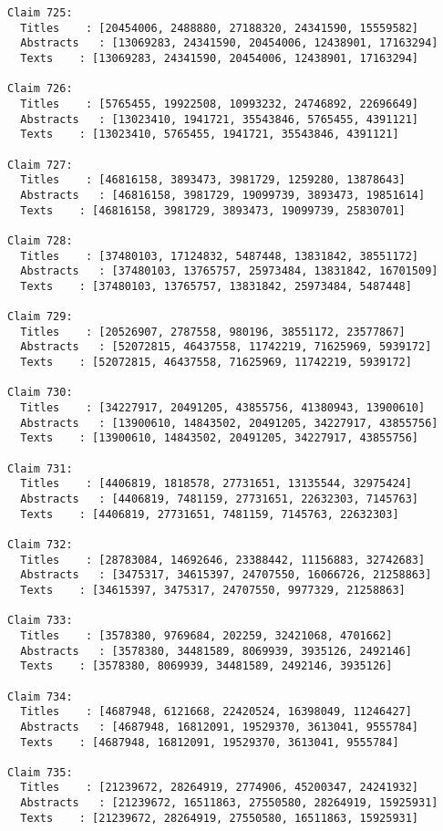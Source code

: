 \documentclass[11pt]{article}
\begin{document}
\begin{Verbatim}[commandchars=\\\{\}]
Claim 725:
  Titles    : [20454006, 2488880, 27188320, 24341590, 15559582]
  Abstracts   : [13069283, 24341590, 20454006, 12438901, 17163294]
  Texts    : [13069283, 24341590, 20454006, 12438901, 17163294]

Claim 726:
  Titles    : [5765455, 19922508, 10993232, 24746892, 22696649]
  Abstracts   : [13023410, 1941721, 35543846, 5765455, 4391121]
  Texts    : [13023410, 5765455, 1941721, 35543846, 4391121]

Claim 727:
  Titles    : [46816158, 3893473, 3981729, 1259280, 13878643]
  Abstracts   : [46816158, 3981729, 19099739, 3893473, 19851614]
  Texts    : [46816158, 3981729, 3893473, 19099739, 25830701]

Claim 728:
  Titles    : [37480103, 17124832, 5487448, 13831842, 38551172]
  Abstracts   : [37480103, 13765757, 25973484, 13831842, 16701509]
  Texts    : [37480103, 13765757, 13831842, 25973484, 5487448]

Claim 729:
  Titles    : [20526907, 2787558, 980196, 38551172, 23577867]
  Abstracts   : [52072815, 46437558, 11742219, 71625969, 5939172]
  Texts    : [52072815, 46437558, 71625969, 11742219, 5939172]

Claim 730:
  Titles    : [34227917, 20491205, 43855756, 41380943, 13900610]
  Abstracts   : [13900610, 14843502, 20491205, 34227917, 43855756]
  Texts    : [13900610, 14843502, 20491205, 34227917, 43855756]

Claim 731:
  Titles    : [4406819, 1818578, 27731651, 13135544, 32975424]
  Abstracts   : [4406819, 7481159, 27731651, 22632303, 7145763]
  Texts    : [4406819, 27731651, 7481159, 7145763, 22632303]

Claim 732:
  Titles    : [28783084, 14692646, 23388442, 11156883, 32742683]
  Abstracts   : [3475317, 34615397, 24707550, 16066726, 21258863]
  Texts    : [34615397, 3475317, 24707550, 9977329, 21258863]

Claim 733:
  Titles    : [3578380, 9769684, 202259, 32421068, 4701662]
  Abstracts   : [3578380, 34481589, 8069939, 3935126, 2492146]
  Texts    : [3578380, 8069939, 34481589, 2492146, 3935126]

Claim 734:
  Titles    : [4687948, 6121668, 22420524, 16398049, 11246427]
  Abstracts   : [4687948, 16812091, 19529370, 3613041, 9555784]
  Texts    : [4687948, 16812091, 19529370, 3613041, 9555784]

Claim 735:
  Titles    : [21239672, 28264919, 2774906, 45200347, 24241932]
  Abstracts   : [21239672, 16511863, 27550580, 28264919, 15925931]
  Texts    : [21239672, 28264919, 27550580, 16511863, 15925931]


\end{Verbatim}
\end{document}
